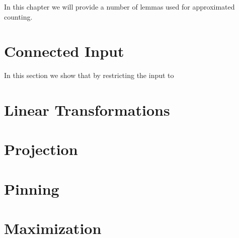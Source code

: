 In this chapter we will provide a number of lemmas used for approximated counting. 
\section{Connected Input}
In this section we show that by restricting the input to
\section{Linear Transformations}
\section{Projection}
\section{Pinning}
\section{Maximization}
